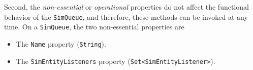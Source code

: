 Second, the {\em non-essential\/} or {\em operational\/} properties
do not affect the functional behavior of the \lstinline|SimQueue|,
and therefore,
these methods can be invoked at any time.
On a \lstinline|SimQueue|,
the two non-essential properties are
\begin{itemize}
	\item The \lstinline|Name| property (\lstinline|String|).
	\item The \lstinline|SimEntityListeners| property (\lstinline|Set<SimEntityListener>|).
\end{itemize}


